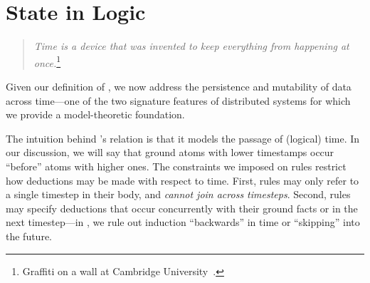 \section{State in Logic}
\label{sec:stateupdate}





\begin{quote}
%
\emph{Time is a device that was invented to keep everything from
happening at once.}\footnote{Graffiti on a wall at Cambridge
University~\cite{scheme}.}
%
\end{quote} 

Given our definition of \slang, we now address the persistence and mutability
of data across time---one of the two signature features of distributed systems
for which we provide a model-theoretic foundation.

The intuition behind \slang's  relation is that it models the
passage of (logical) time.  In our discussion, we will say that ground atoms
with lower timestamps occur ``before'' atoms with higher ones.
The constraints we imposed on \slang rules restrict how deductions may be made
with respect to time.  First, rules may only refer to a single timestep in
their body, and {\em cannot join across timesteps}.  Second, rules may specify
deductions that occur concurrently with their ground facts or in the next
timestep---in \slang, we rule out induction ``backwards'' in time or
``skipping'' into the future.


